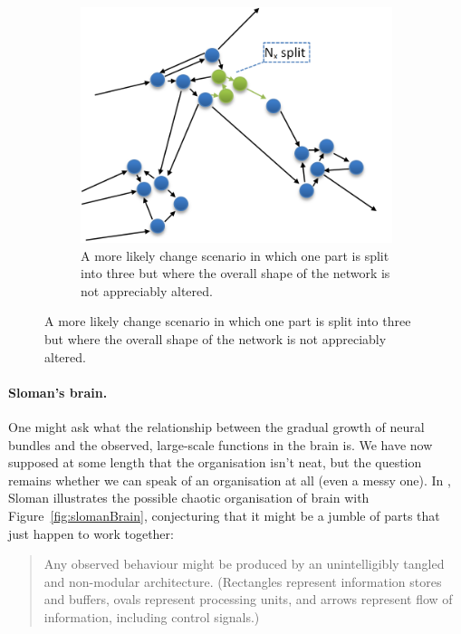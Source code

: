 \begin{figure}
\begin{subfigure}[t]{0.45\textwidth}
		\includegraphics[width=\textwidth]{figs/likelyEvolution.png}
		\caption{A more likely change scenario in which one part is split into three but where the overall shape of the network is not appreciably altered.}
		\label{fig:likelyEvolution}
	\end{subfigure}
\end{figure}

\paragraph{Sloman's brain.} One might ask what the relationship between the gradual growth of neural bundles and the observed, large-scale functions in the brain is. We have now supposed at some length that the organisation isn't neat, but the question remains whether we can speak of an organisation at all (even a messy one). In \cite[p. 8]{sloman2000}, Sloman illustrates the possible chaotic organisation of brain with Figure~\ref{fig:slomanBrain}, conjecturing that it might be a jumble of parts that just happen to work together:

\begin{quotation}
	Any observed behaviour might be produced by an unintelligibly tangled and non-modular architecture. (Rectangles represent information stores and buffers, ovals represent processing
	units, and arrows represent flow of information, including control signals.)
\end{quotation}

